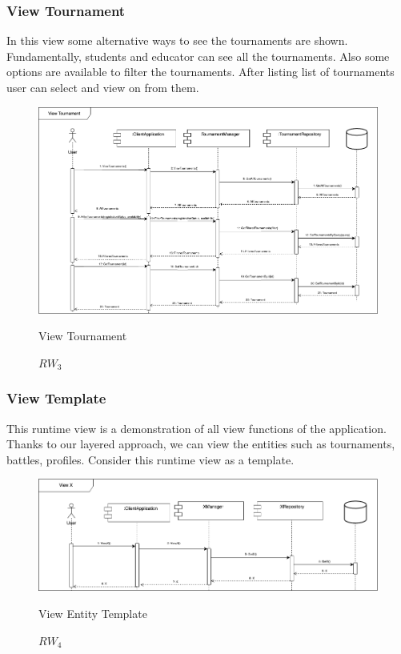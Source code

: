 \subsubsection{View Tournament}
In this view some alternative ways to see the tournaments are shown. Fundamentally, students and educator can see all the tournaments. Also some options are available to filter the tournaments. After listing list of tournaments user can select and view on from them.
\begin{figure}[H]
    \centering
    \includegraphics[width=\linewidth]{Images/runtime/view_tournament_runtime.drawio.png}
    \caption{$RW_{3}$} View Tournament
\end{figure}

\subsubsection{View Template}
This runtime view is a demonstration of all view functions of the application. Thanks to our layered approach, we can view the entities such as tournaments, battles, profiles. Consider this runtime view as a template.
\begin{figure}[H]
    \centering
    \includegraphics[width=\linewidth]{Images/runtime/view_template_runtime.drawio.png}
    \caption{$RW_{4}$} View Entity Template
\end{figure}

